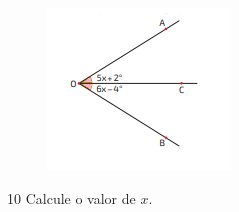 \begin{minipage}{.4\textwidth}
\begin{figure}[H]
\includegraphics[width=\textwidth]{./imgSAEB_8_MAT/media/image33.png}
\end{figure}
\end{minipage}
\begin{minipage}{.6\textwidth}


\end{minipage}

\num{10} Calcule o valor de $x$.

